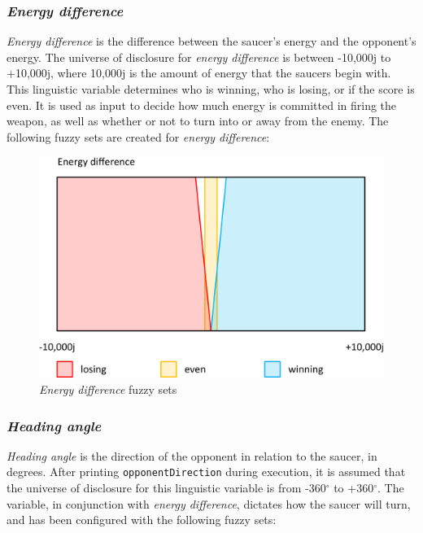 \subsubsection{\emph{Energy difference}}

\emph{Energy difference} is the difference between the saucer's energy and the opponent's energy. The universe of disclosure for \emph{energy difference} is between -10,000j to +10,000j, where 10,000j is the amount of energy that the saucers begin with. This linguistic variable determines who is winning, who is losing, or if the score is even. It is used as input to decide how much energy is committed in firing the weapon, as well as whether or not to turn into or away from the enemy. The following fuzzy sets are created for \emph{energy difference}:

\begin{figure}[H]
\centering
\caption{\emph{Energy difference} fuzzy sets}
\includegraphics[scale=0.1]{./img/pdf/energyDiffSets.pdf}
\end{figure}

\subsubsection{\emph{Heading angle}}

\emph{Heading angle} is the direction of the opponent in relation to the saucer, in degrees. After printing \texttt{opponentDirection} during execution, it is assumed that the universe of disclosure for this linguistic variable is from -360$^{\circ}$ to +360$^{\circ}$. The variable, in conjunction with \emph{energy difference}, dictates how the saucer will turn, and has been configured with the following fuzzy sets:

